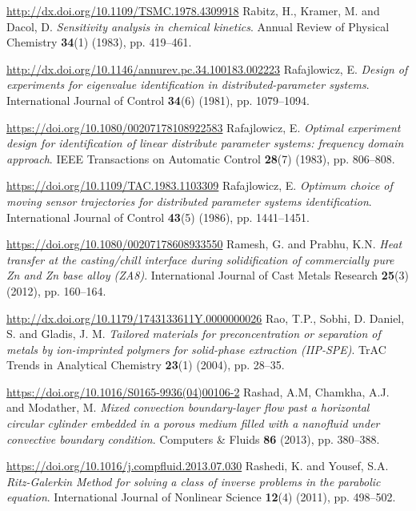 \begin{thebibliography}{301}
\url{http://dx.doi.org/10.1109/TSMC.1978.4309918}
%
%
 Rabitz, H., Kramer, M. and Dacol, D. {\it Sensitivity analysis in chemical kinetics}. Annual Review of Physical Chemistry {\bf 34}(1) (1983), pp. 419--461.

\url{http://dx.doi.org/10.1146/annurev.pc.34.100183.002223}
%
%
 Rafajlowicz, E. {\it Design of experiments for eigenvalue identification in distributed-parameter systems}. International Journal of Control {\bf 34}(6) (1981), pp. 1079--1094.

\url{https://doi.org/10.1080/00207178108922583}
%
%
 Rafajlowicz, E. {\it Optimal experiment design for identification of linear distribute parameter systems: frequency domain approach}. IEEE Transactions on Automatic Control {\bf 28}(7) (1983), pp. 806--808.

\url{https://doi.org/10.1109/TAC.1983.1103309}
%
%
 Rafajlowicz, E. {\it Optimum choice of moving sensor trajectories for distributed parameter systems identification}. International Journal of Control {\bf 43}(5) (1986), pp. 1441--1451.

\url{https://doi.org/10.1080/00207178608933550}
%
%
 Ramesh, G. and Prabhu, K.N. {\it Heat transfer at the casting/chill interface during solidification of commercially pure Zn and Zn base alloy (ZA8)}. International Journal of Cast Metals Research {\bf 25}(3) (2012), pp. 160--164.

\url{http://dx.doi.org/10.1179/1743133611Y.0000000026}
%
%
 Rao, T.P., Sobhi, D. Daniel, S. and Gladis, J. M. {\it Tailored materials for preconcentration or separation of metals by ion-imprinted polymers for solid-phase extraction (IIP-SPE)}. TrAC Trends in Analytical Chemistry {\bf 23}(1) (2004), pp. 28--35.

\url{https://doi.org/10.1016/S0165-9936(04)00106-2}
%
%
 Rashad, A.M, Chamkha, A.J. and Modather, M. {\it Mixed convection boundary-layer flow past a horizontal circular cylinder embedded in a porous medium filled with a nanofluid under convective boundary condition}. Computers \& Fluids {\bf 86} (2013), pp. 380--388.

\url{https://doi.org/10.1016/j.compfluid.2013.07.030}
%
%
 Rashedi, K. and Yousef, S.A. {\it Ritz-Galerkin Method for solving a class of inverse problems in the parabolic equation}. International Journal of Nonlinear Science {\bf 12}(4) (2011), pp. 498--502.


\end{thebibliography}

